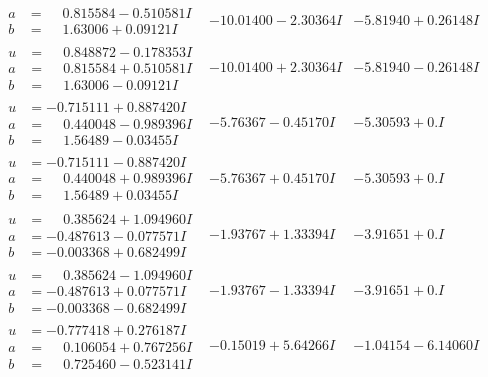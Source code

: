 \documentclass[1p]{elsarticle_modified}
\theoremstyle{definition}
\begin{document}
$$\begin{array}{c|c|c}
\begin{aligned}
a &= \phantom{-}0.815584 - 0.510581 I \\
b &= \phantom{-}1.63006 + 0.09121 I\end{aligned}
 & -10.01400 - 2.30364 I & -5.81940 + 0.26148 I \\ \hline\begin{aligned}
u &= \phantom{-}0.848872 - 0.178353 I \\
a &= \phantom{-}0.815584 + 0.510581 I \\
b &= \phantom{-}1.63006 - 0.09121 I\end{aligned}
 & -10.01400 + 2.30364 I & -5.81940 - 0.26148 I \\ \hline\begin{aligned}
u &= -0.715111 + 0.887420 I \\
a &= \phantom{-}0.440048 - 0.989396 I \\
b &= \phantom{-}1.56489 - 0.03455 I\end{aligned}
 & -5.76367 - 0.45170 I & -5.30593 + 0. I\phantom{ +0.000000I} \\ \hline\begin{aligned}
u &= -0.715111 - 0.887420 I \\
a &= \phantom{-}0.440048 + 0.989396 I \\
b &= \phantom{-}1.56489 + 0.03455 I\end{aligned}
 & -5.76367 + 0.45170 I & -5.30593 + 0. I\phantom{ +0.000000I} \\ \hline\begin{aligned}
u &= \phantom{-}0.385624 + 1.094960 I \\
a &= -0.487613 - 0.077571 I \\
b &= -0.003368 + 0.682499 I\end{aligned}
 & -1.93767 + 1.33394 I & -3.91651 + 0. I\phantom{ +0.000000I} \\ \hline\begin{aligned}
u &= \phantom{-}0.385624 - 1.094960 I \\
a &= -0.487613 + 0.077571 I \\
b &= -0.003368 - 0.682499 I\end{aligned}
 & -1.93767 - 1.33394 I & -3.91651 + 0. I\phantom{ +0.000000I} \\ \hline\begin{aligned}
u &= -0.777418 + 0.276187 I \\
a &= \phantom{-}0.106054 + 0.767256 I \\
b &= \phantom{-}0.725460 - 0.523141 I\end{aligned}
 & -0.15019 + 5.64266 I & -1.04154 - 6.14060 I \\ \hline\begin{aligned}

\end{aligned}
\end{array}$$
\end{document}
